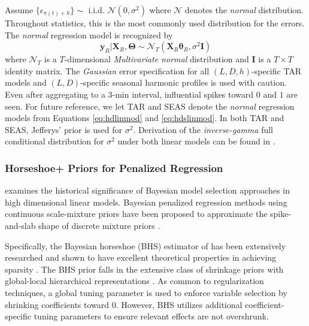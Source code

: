 Assume $\{\epsilon_{\pi(t)+h}\} \sim \textrm{ i.i.d. }\mathcal{N}(0,\sigma^2)$ where $\mathcal{N}$ denotes the \textit{normal} distribution. Throughout statistics, this is the most commonly used distribution for the errors. The \textit{normal} regression model is recognized by 
\begin{equation}
\label{eq:normalmod}
\bm{y}_R|\bm{X}_R,\bm{\Theta}\sim \mathcal{N}_T(\bm{X}_R\bm{\theta}_R,\sigma^2\bm{I})
\end{equation}
where $\mathcal{N}_T$ is a $T$-dimensional \textit{Multivariate normal} distribution and $\bm{I}$ is a $T\times T$ identity matrix. The \textit{Gaussian} error specification for all $(L,D,h)$-specific TAR models and $(L,D)$-specific seasonal harmonic profiles is used with caution. Even after aggregating to a 3-min interval, influential spikes toward $0$ and $1$ are seen. For future reference, we let TAR and SEAS denote the \textit{normal} regression models from Equations \ref{eq:hdlinmod} and \ref{eq:hdslinmod}. In both TAR and SEAS, Jefferys' prior is used for $\sigma^2$. Derivation of the \textit{inverse-gamma} full conditional distribution for $\sigma^2$ under both linear models can be found in \cite{bayesreg}.

\subsubsection{Horseshoe+ Priors for Penalized Regression}

\cite{Mallick2013} examines the historical significance of Bayesian model selection approaches in high dimensional linear models. Bayesian penalized regression methods using continuous scale-mixture priors \citep{OHara2009,Polson2010} have been proposed to approximate the spike-and-slab shape of discrete mixture priors \citep{Mitchell1988,George1993,Madigan1994,Carlin1995,Kuo1998,Ishwaran2005,Ishwaran2011}.

Specifically, the Bayesian horseshoe (BHS) estimator of \citep{Carvalho2009,Carvalho2010} has been extensively researched and shown to have excellent theoretical properties in achieving sparsity \citep{Polson2012,Datta2013,vanderPas2014}. The BHS prior falls in the extensive class of shrinkage priors with global-local hierarchical representations \citep{Polson2010}. As common to regularization techniques, a global tuning parameter is used to enforce variable selection by shrinking coefficients toward 0. However, BHS utilizes additional coefficient-specific tuning parameters to ensure relevant effects are not overshrunk. 

